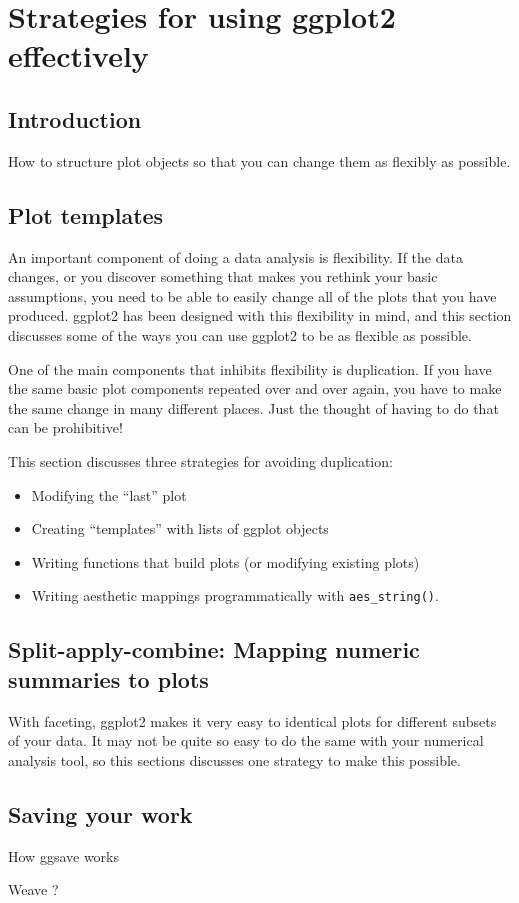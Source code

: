 

\chapter{Strategies for using ggplot2 effectively}
\section{Introduction}
\label{sec:introduction}

How to structure plot objects so that you can change them as flexibly as possible.

\section{Plot templates}
\label{sec:templates}

An important component of doing a data analysis is flexibility.  If the data changes, or you discover something that makes you rethink your basic assumptions, you need to be able to easily change all of the plots that you have produced.  ggplot2 has been designed with this flexibility in mind, and this section discusses some of the ways you can use ggplot2 to be as flexible as possible.

One of the main components that inhibits flexibility is duplication. If you have the same basic plot components repeated over and over again, you have to make the same change in many different places.  Just the thought of having to do that can be prohibitive!

This section discusses three strategies for avoiding duplication:

\begin{itemize}
  \item Modifying the ``last'' plot

  \item Creating ``templates'' with lists of ggplot objects

  \item Writing functions that build plots (or modifying existing plots)

  \item Writing aesthetic mappings programmatically with {\tt aes\_string()}.
\end{itemize}


\section{Split-apply-combine: Mapping numeric summaries to plots}
\label{sec:split_apply_combine}

With faceting, ggplot2 makes it very easy to identical plots for different subsets of your data.  It may not be quite so easy to do the same with your numerical analysis tool, so this sections discusses one strategy to make this possible.  

\section{Saving your work}
\label{sec:saving_to_disk}

How ggsave works

Weave ?


